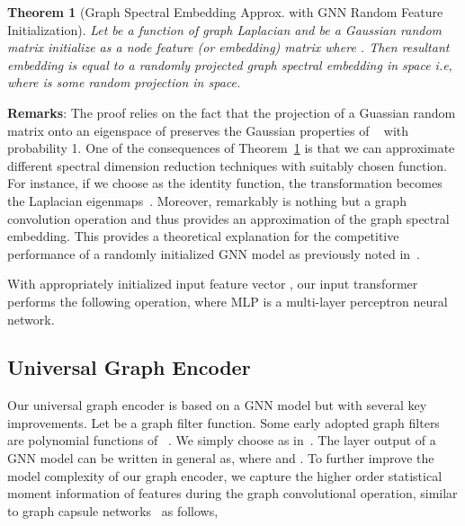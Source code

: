 \documentclass{article}
\newtheorem{theorem}{Theorem}
\begin{document}
\begin{theorem}[Graph Spectral Embedding Approx. with GNN Random   Feature Initialization]\label{theorem:gaussian_initialize} 
	Let  be a function of graph Laplacian and  be a  Gaussian random matrix  initialize as a node feature (or embedding) matrix where . Then     resultant embedding  is equal to a randomly projected  graph spectral embedding in  space i.e,  where  is some random projection in  space.
\end{theorem}

\noindent\textbf{{Remarks}}: The proof relies on the fact that the projection of a Guassian random matrix   onto an eigenspace  of   preserves  the Gaussian properties of ~\cite{paratte2016fast} with probability 1. One of the consequences of Theorem~\ref{theorem:gaussian_initialize} is that  we can approximate different spectral dimension reduction techniques with suitably chosen  function. For instance,  if we choose  as the identity function, the transformation becomes the  Laplacian eigenmaps~\cite{belkin2003laplacian}. Moreover,  remarkably  is nothing but a graph convolution operation and thus provides an approximation of the graph spectral embedding. This provides a theoretical explanation for the competitive performance of a randomly initialized GNN model as previously noted in~\cite{kipf2016semi, velivckovic2018deep}. 

With  	   appropriately initialized  input feature vector ,  our input  transformer performs the following  operation, 
where MLP is a multi-layer perceptron  neural network.
\vspace{-0.8em}
\subsection{Universal Graph  Encoder}
\vspace{-0.7em}
Our universal graph encoder is based on a GNN model but with several key improvements. Let  be a graph filter function. Some early adopted graph filters are  polynomial functions of ~\cite{defferrard2016convolutional}. We simply choose  as  in~\cite{kipf2016semi}. The   layer output of a GNN model  can be written in general as,  where  and . To further improve the model complexity of our graph encoder, we  capture  the  higher order  statistical  moment information of features during the graph convolutional operation, similar to graph capsule networks~\cite{verma2018graph} as follows,   
\end{document}

